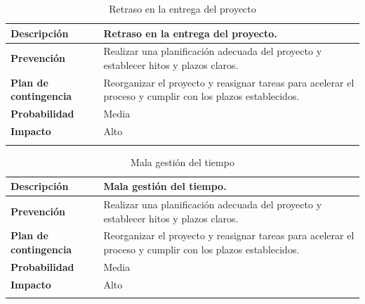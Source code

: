 \documentclass{report}
\begin{document}
        \begin{center}
            \begin{longtable}{|p{6cm}|p{6cm}|}
                \hline
                \textbf{Descripción} & Retraso en la entrega del proyecto.\\
                \hline
                \textbf{Prevención} & Realizar una planificación adecuada del proyecto y establecer hitos y plazos claros.\\
                \hline
                \textbf{Plan de contingencia} & Reorganizar el proyecto y reasignar tareas para acelerar el proceso y cumplir con los plazos establecidos.\\
                \hline
                \textbf{Probabilidad} & Media\\
                \hline
                \textbf{Impacto} & Alto\\
                \hline
                \caption{Retraso en la entrega del proyecto}
            \end{longtable}
        \end{center}
        \begin{center}
            \begin{longtable}{|p{6cm}|p{6cm}|}
                \hline
                \textbf{Descripción} & Mala gestión del tiempo.\\
                \hline
                \textbf{Prevención} & Realizar una planificación adecuada del proyecto y establecer hitos y plazos claros.\\
                \hline
                \textbf{Plan de contingencia} & Reorganizar el proyecto y reasignar tareas para acelerar el proceso y cumplir con los plazos establecidos.\\
                \hline
                \textbf{Probabilidad} & Media\\
                \hline
                \textbf{Impacto} & Alto\\
                \hline
                \caption{Mala gestión del tiempo}
            \end{longtable}
        \end{center}
\end{document}
